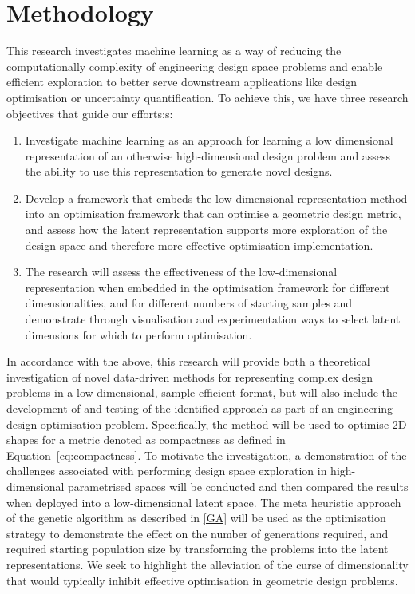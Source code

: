 \documentclass{article}
\begin{document}
\section{Methodology}
This research investigates machine learning as a way of reducing the computationally complexity of engineering design space problems and enable efficient exploration to better serve downstream applications like design optimisation or uncertainty quantification. To achieve this, we have three research objectives that guide our efforts:s:
\begin{enumerate}
    \item Investigate machine learning as an approach for learning a low dimensional representation of an otherwise high-dimensional design problem and assess the ability to use this representation to generate novel designs.
    \item Develop a framework that embeds the low-dimensional representation method into an optimisation framework that can optimise a geometric design metric, and assess how the latent representation supports more exploration of the design space and therefore more effective optimisation implementation.
    \item The research will assess the effectiveness of the low-dimensional representation when embedded in the optimisation framework for different dimensionalities, and for different numbers of starting samples and demonstrate through visualisation and experimentation ways to select latent dimensions for which to perform optimisation.
\end{enumerate}

In accordance with the above, this research will provide both a theoretical investigation of novel data-driven methods for representing complex design problems in a low-dimensional, sample efficient format, but will also include the development of and testing of the identified approach as part of an engineering design optimisation problem. Specifically, the method will be used to optimise 2D shapes for a metric denoted as compactness as defined in Equation~\eqref{eq:compactness}. To motivate the investigation, a demonstration of the challenges associated with performing design space exploration in high-dimensional parametrised spaces will be conducted and then compared the results when deployed into a low-dimensional latent space. The meta heuristic approach of the genetic algorithm as described in \ref{GA} will be used  as the optimisation strategy to demonstrate the effect on the number of generations required, and required starting population size by transforming the problems into the latent representations. We seek to highlight the alleviation of the curse of dimensionality that would typically inhibit effective optimisation in geometric design problems.
\end{document}
